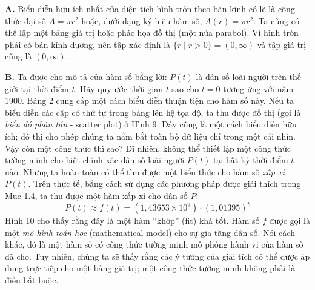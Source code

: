 \begin{minipage}[t]{0.708\textwidth}
    \fontsize{9.3pt}{13.2pt}\selectfont
    \noindent
    \textbf{A.} Biểu diễn hữu ích nhất của diện tích hình tròn theo bán kính có lẽ là công thức đại số $A = \pi r^2$ hoặc, dưới dạng ký hiệu hàm số, $A(r) = \pi r^2$. Ta cũng có thể lập một bảng giá trị hoặc phác họa đồ thị (một nửa parabol). Vì hình tròn phải có bán kính dương, nên tập xác định là $\{r \mid r > 0\} = (0, \infty)$ và tập giá trị cũng là $(0, \infty)$.

    \vspace{4pt}
    \noindent
    \textbf{B.} Ta được cho mô tả của hàm số bằng lời: $P(t)$ là dân số loài người trên thế giới tại thời điểm $t$. Hãy quy ước thời gian $t$ sao cho $t = 0$ tương ứng với năm 1900. Bảng 2 cung cấp một cách biểu diễn thuận tiện cho hàm số này. Nếu ta biểu diễn các cặp có thứ tự trong bảng lên hệ tọa độ, ta thu được đồ thị (gọi là \emph{biểu đồ phân tán} - scatter plot) ở Hình 9. Đây cũng là một cách biểu diễn hữu ích; đồ thị cho phép chúng ta nắm bắt toàn bộ dữ liệu chỉ trong một cái nhìn. Vậy còn một công thức thì sao? Dĩ nhiên, không thể thiết lập một công thức tường minh cho biết chính xác dân số loài người $P(t)$ tại bất kỳ thời điểm $t$ nào. Nhưng ta hoàn toàn có thể tìm được một biểu thức cho hàm số \emph{xấp xỉ} $P(t)$. Trên thực tế, bằng cách sử dụng các phương pháp được giải thích trong Mục 1.4, ta thu được một hàm xấp xỉ cho dân số $P$:
    \[
    P(t) \approx f(t) = (1{,}43653 \times 10^9) \cdot (1{,}01395)^t
    \]
    Hình 10 cho thấy rằng đây là một hàm “khớp” (fit) khá tốt. Hàm số $f$ được gọi là một \emph{mô hình toán học} (mathematical model) cho sự gia tăng dân số. Nói cách khác, đó là một hàm số có công thức tường minh mô phỏng hành vi của hàm số đã cho. Tuy nhiên, chúng ta sẽ thấy rằng các ý tưởng của giải tích có thể được áp dụng trực tiếp cho một bảng giá trị; một công thức tường minh không phải là điều bắt buộc.

    \begin{center}
\end{center}
\end{minipage}
